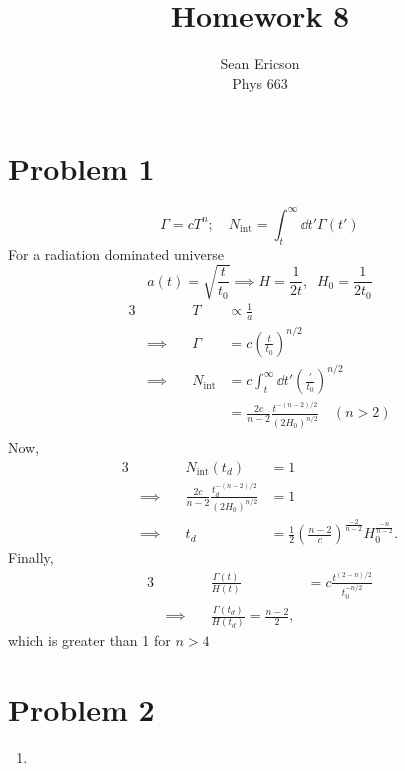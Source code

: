 \documentclass[12pt]{article}
\begin{document}
\title{Homework 8}
\author{Sean Ericson \\ Phys 663}
\maketitle

\section*{Problem 1}
\[ \Gamma = cT^n; \quad N_\text{int} = \int_t^\infty \dd t' \Gamma(t') \]
For a radiation dominated universe
\[ a(t) = \sqrt{\frac{t}{t_0}} \implies H = \frac{1}{2t}, \;\; H_0 = \frac{1}{2t_0} \]
\begin{alignat*}{3}
    & \quad & T &\propto \frac{1}{a} \\
    &\implies\quad & \Gamma &= c\left(\frac{t}{t_0}\right)^{n/2} \\
    &\implies\quad & N_\text{int} &= c\int_t^\infty \dd t' \left(\frac{'}{t_0}\right)^{n/2} \\
    & \quad &   &= \frac{2c}{n-2} \frac{t^{-(n-2)/2}}{(2H_0)^{n/2}} \quad (n > 2) \\
\end{alignat*}
Now,
\begin{alignat*}{3}
    & \quad & N_\text{int}(t_d) &= 1 \\
    &\implies\quad & \frac{2c}{n-2} \frac{t_d^{-(n-2)/2}}{(2H_0)^{n/2}} &= 1 \\
    &\implies\quad & t_d &= \frac{1}{2}\left(\frac{n-2}{c}\right)^{\frac{-2}{n-2}}H_0^{\frac{-n}{n-2}}.
\end{alignat*}
Finally,
\begin{alignat*}{3}
    & \quad & \frac{\Gamma(t)}{H(t)} &= c \frac{t^{(2-n)/2}}{t_0^{-n/2}} \\
    &\implies\quad & \frac{\Gamma(t_d)}{H(t_d)} = \frac{n-2}{2},
\end{alignat*}
which is greater than 1 for $n>4$

\section*{Problem 2}
\begin{enumerate}[label=\roman*)]
    \item 
\end{enumerate}
\end{document}

